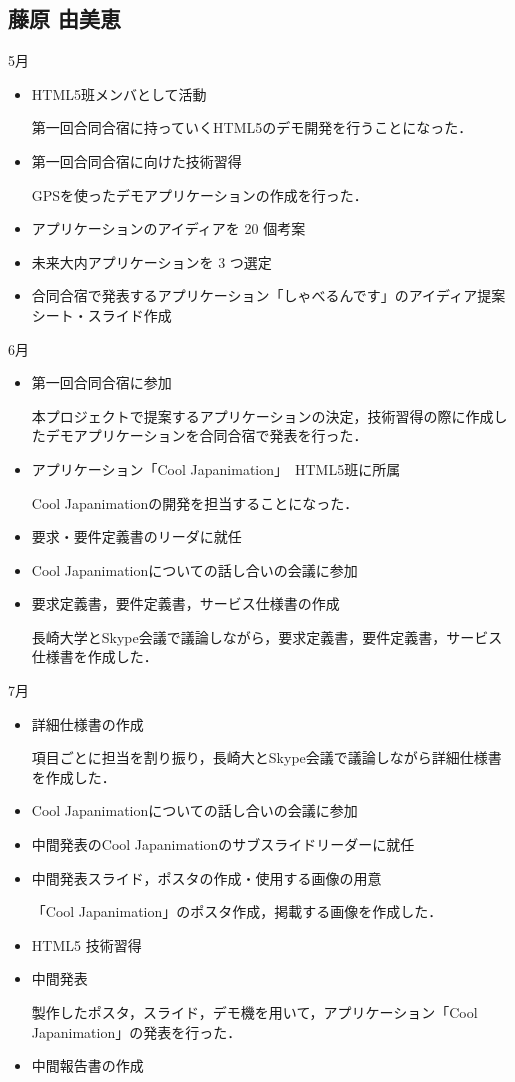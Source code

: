 \subsection{藤原 由美恵}
5月
\begin{itemize}
\item HTML5班メンバとして活動
\par 第一回合同合宿に持っていくHTML5のデモ開発を行うことになった．
\item 第一回合同合宿に向けた技術習得
\par GPSを使ったデモアプリケーションの作成を行った．
\item アプリケーションのアイディアを 20 個考案
\item 未来大内アプリケーションを 3 つ選定
\item 合同合宿で発表するアプリケーション「しゃべるんです」のアイディア提案シート・スライド作成
\end{itemize}
6月
\begin{itemize}
\item 第一回合同合宿に参加
\par 本プロジェクトで提案するアプリケーションの決定，技術習得の際に作成したデモアプリケーションを合同合宿で発表を行った．
\item アプリケーション「Cool Japanimation」　HTML5班に所属
\par Cool Japanimationの開発を担当することになった．
\item 要求・要件定義書のリーダに就任
\item Cool Japanimationについての話し合いの会議に参加
\item 要求定義書，要件定義書，サービス仕様書の作成
\par 長崎大学とSkype会議で議論しながら，要求定義書，要件定義書，サービス仕様書を作成した．
\end{itemize}
7月
\begin{itemize}
\item 詳細仕様書の作成
\par 項目ごとに担当を割り振り，長崎大とSkype会議で議論しながら詳細仕様書を作成した．
\item Cool Japanimationについての話し合いの会議に参加
\item 中間発表のCool Japanimationのサブスライドリーダーに就任
\item 中間発表スライド，ポスタの作成・使用する画像の用意
\par 「Cool Japanimation」のポスタ作成，掲載する画像を作成した．
\item HTML5 技術習得
\item 中間発表
\par 製作したポスタ，スライド，デモ機を用いて，アプリケーション「Cool Japanimation」の発表を行った．
\item 中間報告書の作成
\end{itemize}
